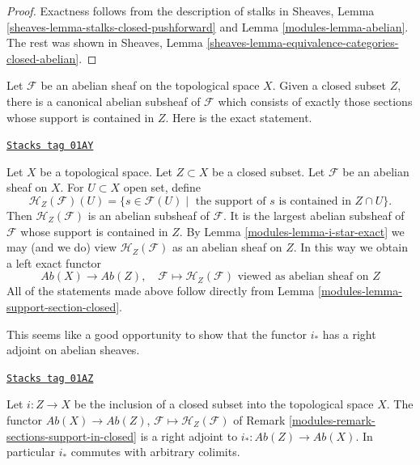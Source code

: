 \begin{proof}

Exactness follows from the description of
stalks in Sheaves, Lemma \ref{sheaves-lemma-stalks-closed-pushforward}
and Lemma \ref{modules-lemma-abelian}. The rest was shown in
Sheaves, Lemma \ref{sheaves-lemma-equivalence-categories-closed-abelian}.
\end{proof}

Let $\mathcal{F}$ be an abelian sheaf on the topological space $X$. Given
a closed subset $Z$, there is a canonical abelian subsheaf of $\mathcal{F}$
which consists of exactly those sections whose support is contained in $Z$.
Here is the exact statement.

\begin{remark}
\label{modules-remark-sections-support-in-closed}
\href{https://stacks.math.columbia.edu/tag/01AY}{\texttt{Stacks tag 01AY}}

Let $X$ be a topological space. Let $Z \subset X$ be a closed subset.
Let $\mathcal{F}$ be an abelian sheaf on $X$. For $U \subset X$ open set, define
$$
\mathcal{H}_Z(\mathcal{F})(U) =
\{s \in \mathcal{F}(U) \mid
\text{ the support of }s\text{ is contained in }Z \cap U\}.
$$
Then $\mathcal{H}_Z(\mathcal{F})$ is an abelian subsheaf of $\mathcal{F}$.
It is the largest abelian subsheaf of $\mathcal{F}$ whose support is
contained in $Z$. By Lemma \ref{modules-lemma-i-star-exact} we may (and we do)
view $\mathcal{H}_Z(\mathcal{F})$ as an abelian sheaf on $Z$.
In this way we obtain a left exact functor
$$
\textit{Ab}(X) \longrightarrow \textit{Ab}(Z),\quad
\mathcal{F} \longmapsto \mathcal{H}_Z(\mathcal{F})
\text{ viewed as abelian sheaf on }Z
$$
All of the statements made above follow directly from
Lemma \ref{modules-lemma-support-section-closed}.
\end{remark}

This seems like a good opportunity to show that the functor
$i_*$ has a right adjoint on abelian sheaves.

\begin{lemma}
\label{modules-lemma-i-star-right-adjoint}
\href{https://stacks.math.columbia.edu/tag/01AZ}{\texttt{Stacks tag 01AZ}}

Let $i : Z \to X$ be the inclusion of a closed subset into the
topological space $X$. The functor $\textit{Ab}(X) \to \textit{Ab}(Z)$,
$\mathcal{F} \mapsto \mathcal{H}_Z(\mathcal{F})$ of
Remark \ref{modules-remark-sections-support-in-closed}
is a right adjoint to $i_* : \textit{Ab}(Z) \to \textit{Ab}(X)$.
In particular $i_*$ commutes with arbitrary colimits.
\end{lemma}

